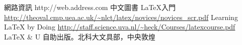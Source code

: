 \CJKvert    {}  
\begingroup                        %
\def\hyperpage#1{\rotatebox[origin=cc]{90}{#1}}
\printindex
\endgroup

    
\begin{thebibliography}{20}        
網路資訊 http://web.address.com
中文圖書
 \LaTeX{}入門
\url{http://theoval.cmp.uea.ac.uk/~nlct/latex/novices/novices_scr.pdf}
 Learning \LaTeX{} by Doing
\url{http://staff.science.uva.nl/~heck/Courses/latexcourse.pdf}
\LaTeX{} \& U 自助出版。北科大文具部，中央敦煌
\end{thebibliography}